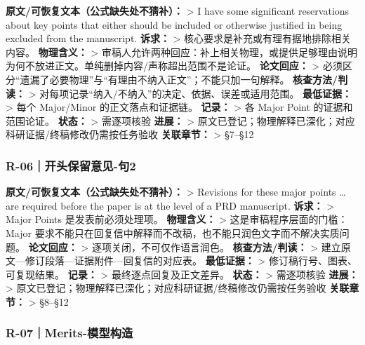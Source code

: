 \documentclass[
]{article}
\begin{document}
\textbf{原文/可恢复文本（公式缺失处不猜补）：} \textgreater{} I have
some significant reservations about key points that either should be
included or otherwise justified in being excluded from the manuscript.
\textbf{诉求：} \textgreater{} 核心要求是补充或有理有据地排除相关内容。
\textbf{物理含义：} \textgreater{}
审稿人允许两种回应：补上相关物理，或提供足够理由说明为何不放进正文。单纯删掉内容/声称超出范围不是论证。
\textbf{论文回应：} \textgreater{}
必须区分``遗漏了必要物理''与``有理由不纳入正文''；不能只加一句解释。
\textbf{核查方法/判读：} \textgreater{}
对每项记录``纳入/不纳入''的决定、依据、误差或适用范围。
\textbf{最低证据：} \textgreater{} 每个 Major/Minor 的正文落点和证据链。
\textbf{记录：} \textgreater{} 各 Major Point 的证据和范围论证。
\textbf{状态：} \textgreater{} 需逐项核验 \textbf{进展：} \textgreater{}
原文已登记；物理解释已深化；对应科研证据/终稿修改仍需按任务验收
\textbf{关联章节：} \textgreater{} §7--§12

\subsubsection{R-06｜开头保留意见-句2}\label{r-06ux5f00ux5934ux4fddux7559ux610fux89c1-ux53e52}

\textbf{原文/可恢复文本（公式缺失处不猜补）：} \textgreater{} Revisions
for these major points \ldots{} are required before the paper is at the
level of a PRD manuscript. \textbf{诉求：} \textgreater{} Major Points
是发表前必须处理项。 \textbf{物理含义：} \textgreater{}
这是审稿程序层面的门槛：Major
要求不能只在回复信中解释而不改稿，也不能只润色文字而不解决实质问题。
\textbf{论文回应：} \textgreater{} 逐项关闭，不可仅作语言润色。
\textbf{核查方法/判读：} \textgreater{}
建立原文---修订段落---证据附件---回复信的对应表。 \textbf{最低证据：}
\textgreater{} 修订稿行号、图表、可复现结果。 \textbf{记录：}
\textgreater{} 最终逐点回复及正文差异。 \textbf{状态：} \textgreater{}
需逐项核验 \textbf{进展：} \textgreater{}
原文已登记；物理解释已深化；对应科研证据/终稿修改仍需按任务验收
\textbf{关联章节：} \textgreater{} §8--§12

\subsubsection{R-07｜Merits-模型构造}\label{r-07merits-ux6a21ux578bux6784ux9020}
\end{document}
